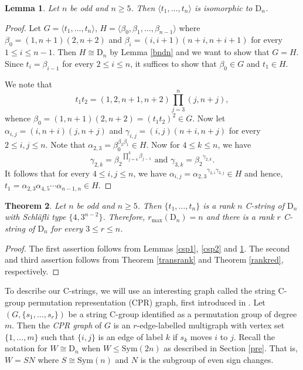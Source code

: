 \documentclass{amsart}
\numberwithin{equation}{section}
\theoremstyle{plain} %
\newtheorem{theorem}{Theorem}[section]
\newtheorem{lemma}[theorem]{Lemma}
\begin{document}
\begin{lemma} \label{csp3}
Let $n$ be odd and $n \ge 5$. Then $\langle t_1,\dots,t_n \rangle$ is isomorphic to $\mathrm{D}_n$.
\end{lemma}

\begin{proof}
Let $G=\langle t_1,\dots,t_n \rangle$, $H=\langle \beta_0,\beta_1,\dots,\beta_{n-1} \rangle$ where $\beta_0=(1,n+1)(2,n+2)$ and $\beta_i=(i,i+1)(n+i,n+i+1)$ for every $1 \leq i \leq n-1$. Then $H \cong \mathrm{D}_n$ by Lemma \ref{bndn} and we want to show that $G=H$. Since $t_i=\beta_{i-1}$ for every $2 \leq i \leq n$, it suffices to show that $\beta_0 \in G$ and $t_1 \in H$.
\par We note that $$t_1 t_2 = (1,2,n+1,n+2)\prod_{j=3}^n (j,n+j),$$ whence $\beta_0 = (1,n+1)(2,n+2)=(t_1 t_2)^2 \in G$. Now let $\alpha_{i,j}=(i,n+i)(j,n+j)$ and $\gamma_{i,j}=(i,j)(n+i,n+j)$ for every $2 \leq i,j \leq n$.  Note that $\alpha_{2,3}=\beta_0^{\beta_2\beta_1} \in H$. Now for $4 \leq k \leq n$, we have $$\gamma_{2,k}={\beta_2}^{\prod_{j=4}^k \beta_{j-1}} \text{ and } \gamma_{3,k}={\beta_2}^{\gamma_{2,k}}.$$ It follows that for every $4 \leq i,j \leq n$, we have $\alpha_{i,j}={\alpha_{2,3}}^{\gamma_{2,i}\gamma_{3,j}} \in H$ and hence, $t_1=\alpha_{2,3}\alpha_{4,5}\cdots\alpha_{n-1,n} \in H$.
\end{proof}

\begin{theorem}\label{nodd}
Let $n$ be odd and $n \ge 5$. Then $\{t_1,\dots,t_n\}$ is a rank $n$ C-string of $\mathrm{D}_n$ with Schl\"{a}fli type $\{4,3^{n-2}\}$. Therefore, $r_{\mathrm{max}}(\mathrm{D}_n)=n$ and there is a rank $r$ C-string of $\mathrm{D}_n$ for every $3 \leq r \leq n$.
\end{theorem}

\begin{proof}
The first assertion follows from Lemmas \ref{csp1}, \ref{csp2} and \ref{csp3}. The second and third assertion follows from Theorem \ref{transrank} and  Theorem \ref{rankred}, respectively.
\end{proof}

To describe our C-strings, we will use an interesting graph called the string C-group permutation representation (CPR) graph, first introduced in \cite{cpr}. Let $(G,\{ s_1, \dots, s_r \})$ be a string C-group identified as a permutation group of degree $m$. Then the \emph{CPR graph} of $G$ is an $r$-edge-labelled multigraph with vertex set $\{1,\dots,m\}$ such that $\{i,j\}$ is an edge of label $k$ if $s_k$ moves $i$ to $j$. Recall the notation for $W \cong \mathrm{D}_n$ when $W \leq \mathrm{Sym}(2n)$ as described in Section \ref{pre}. That is, $W = SN$ where $S \cong \mathrm{Sym}(n)$ and $N$ is the subgroup of even sign changes.
\end{document}
